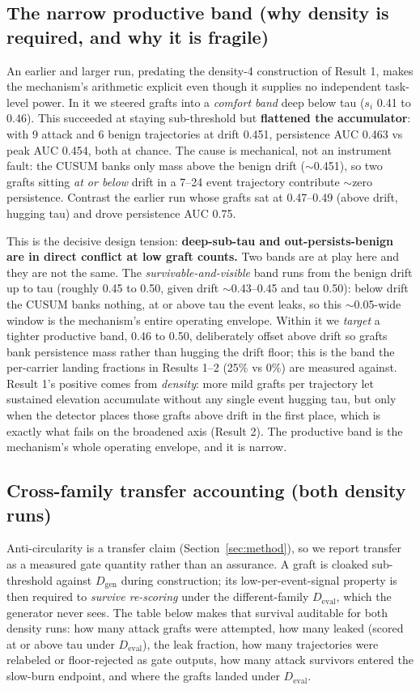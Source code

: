 \documentclass[11pt]{article}
\newcommand{\Dgen}{\ensuremath{D_{\mathrm{gen}}}}
\newcommand{\Deval}{\ensuremath{D_{\mathrm{eval}}}}
\begin{document}
\subsection{The narrow productive band (why density is required, and why it is fragile)}\label{sec:band}

An earlier and larger run, predating the density-4 construction of Result 1, makes the mechanism's
arithmetic explicit even though it supplies no independent task-level power. In it we steered grafts
into a \emph{comfort band} deep below tau ($s_i$ 0.41 to 0.46). This succeeded at staying sub-threshold but
\textbf{flattened the accumulator}: with 9
attack and 6 benign trajectories at drift 0.451, persistence AUC 0.463 vs peak AUC 0.454, both at
chance. The cause is mechanical, not an instrument fault: the CUSUM banks only mass above the benign
drift ($\sim$0.451), so two grafts sitting \emph{at or below} drift in a 7--24 event trajectory contribute
$\sim$zero persistence. Contrast the earlier run whose grafts sat at 0.47--0.49 (above drift, hugging
tau) and drove persistence AUC 0.75.

This is the decisive design tension: \textbf{deep-sub-tau and out-persists-benign are in direct conflict
at low graft counts.} Two bands are at play here and they are not the same. The \emph{survivable-and-visible} band runs from the benign drift up to tau (roughly 0.45 to 0.50, given drift $\sim$0.43--0.45 and
tau 0.50): below drift the CUSUM banks nothing, at or above tau the event leaks, so this $\sim$0.05-wide
window is the mechanism's entire operating envelope. Within it we \emph{target} a tighter productive band,
0.46 to 0.50, deliberately offset above drift so grafts bank persistence mass rather than hugging the
drift floor; this is the band the per-carrier landing fractions in Results 1--2 (25\% vs 0\%) are
measured against. Result 1's positive comes
from \emph{density}: more mild grafts per trajectory let sustained elevation accumulate without any single
event hugging tau, but only when the detector places those grafts above drift in the first place,
which is exactly what fails on the broadened axis (Result 2). The productive band is the mechanism's
whole operating envelope, and it is narrow.

\subsection{Cross-family transfer accounting (both density runs)}

Anti-circularity is a transfer claim (Section~\ref{sec:method}), so we report transfer as a measured gate quantity
rather than an assurance. A graft is cloaked sub-threshold against \Dgen{} during construction; its
low-per-event-signal property is then required to \emph{survive re-scoring} under the different-family
\Deval{}, which the generator never sees. The table below makes that survival auditable for both density
runs: how many attack grafts were attempted, how many leaked (scored at or above tau under \Deval{}),
the leak fraction, how many trajectories were relabeled or floor-rejected as gate outputs, how many
attack survivors entered the slow-burn endpoint, and where the grafts landed under \Deval{}.
\end{document}
